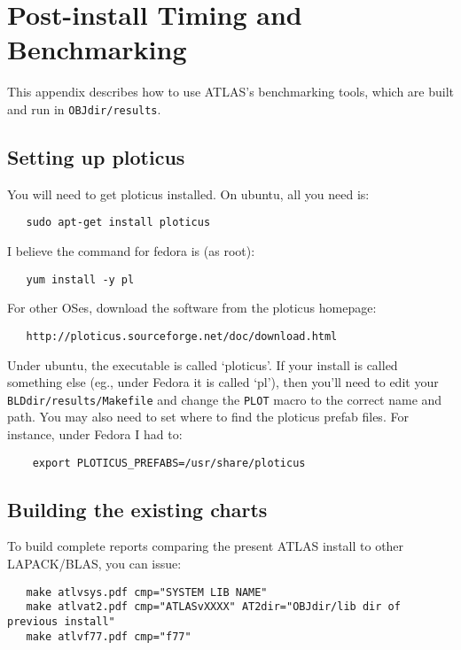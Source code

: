\documentclass[11pt]{article}
\begin{document}


\newpage
\appendix

\section{Post-install Timing and Benchmarking}
\label{sec-full-timing}

This appendix describes how to use ATLAS's benchmarking tools, which are
built and run in {\tt OBJdir/results}.

\subsection{Setting up ploticus}
You will need to get ploticus installed.  On ubuntu, all you need is:
\begin{verbatim}
   sudo apt-get install ploticus
\end{verbatim}

I believe the command for fedora is (as root):
\begin{verbatim}
   yum install -y pl
\end{verbatim}

For other OSes, download the software from the ploticus homepage:
\begin{verbatim}
   http://ploticus.sourceforge.net/doc/download.html
\end{verbatim}

Under ubuntu, the executable is called `ploticus'.  If your install
is called something else (eg., under Fedora it is called `pl'), then
you'll need to edit your {\tt BLDdir/results/Makefile} and change the
{\tt PLOT} macro to the correct name and path.  You may also need
to set where to find the ploticus prefab files.  For instance, under
Fedora I had to:
\begin{verbatim}
    export PLOTICUS_PREFABS=/usr/share/ploticus
\end{verbatim}

\subsection{Building the existing charts}
\label{sec-excharts}

To build complete reports comparing the present ATLAS install to other
LAPACK/BLAS, you can issue:
\begin{verbatim}
   make atlvsys.pdf cmp="SYSTEM LIB NAME"
   make atlvat2.pdf cmp="ATLASvXXXX" AT2dir="OBJdir/lib dir of previous install"
   make atlvf77.pdf cmp="f77"
\end{verbatim}
\end{document}
